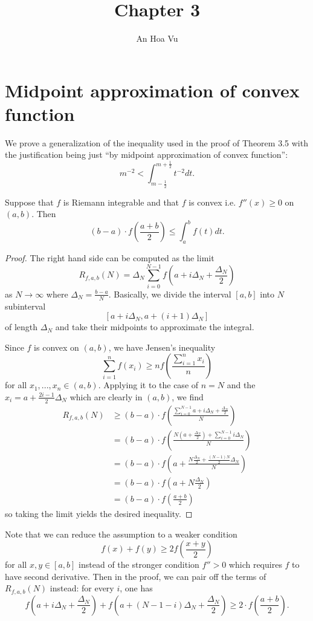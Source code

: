 \documentclass{article}
\title{Chapter 3}
\author{An Hoa Vu}
\begin{document}
\maketitle
\fi

\section{Midpoint approximation of convex function}

We prove a generalization of the inequality used in the proof of Theorem 3.5 with the justification being just ``by midpoint approximation of convex function'':
$$m^{-2} < \int_{m - \frac 12}^{m + \frac 12} t^{-2} dt.$$

Suppose that $f$ is Riemann integrable and that $f$ is convex i.e. $f''(x) \geq 0$ on $(a, b)$. Then
$$(b - a) \cdot f\left(\frac{a+b}{2}\right) \leq \int_a^b f(t) dt.$$

\begin{proof}
The right hand side can be computed as the limit
$$R_{f,a,b}(N) = \Delta_N \sum_{i=0}^{N-1} f\left(a + i \Delta_N + \frac{\Delta_N}{2} \right) $$
as $N \rightarrow \infty$ where $\Delta_N = \frac{b - a}{N}$. Basically, we divide the interval $[a, b]$ into $N$ subinterval
$$[a + i \Delta_N, a + (i+1) \Delta_N]$$
of length $\Delta_N$ and take their midpoints to approximate the integral.

Since $f$ is convex on $(a, b)$, we have Jensen's inequality
$$\sum_{i = 1}^{n} f(x_i) \geq n f\left(\frac{\sum_{i=1}^{n} x_i}{n}\right)$$
for all $x_1, ..., x_n \in (a, b)$. Applying it to the case of $n = N$ and the $x_i = a + \frac{2i - 1}{2} \Delta_N$ which are clearly in $(a, b)$, we find
\begin{align*}
R_{f,a,b}(N) &\geq (b - a) \cdot f \left( \frac{\sum_{i=0}^{N-1} a + i \Delta_N + \frac{\Delta_N}{2} }{N} \right)\\
&= (b - a) \cdot f \left( \frac{N (a + \frac{\Delta_N}{2}) + \sum_{i=0}^{N-1} i \Delta_N }{N} \right)\\
&= (b - a) \cdot f \left( a + \frac{N \frac{\Delta_N}{2} + \frac{(N-1)N}{2} \Delta_N }{N} \right)\\
&= (b - a) \cdot f \left( a + N \frac{\Delta_N }{2} \right)\\
&= (b - a) \cdot f \left( \frac{a + b}{2} \right)
\end{align*}
so taking the limit yields the desired inequality.
\end{proof}

Note that we can reduce the assumption to a weaker condition
$$f(x) + f(y) \geq 2 f\left( \frac{x + y}{2} \right)$$
for all $x, y \in [a, b]$ instead of the stronger condition $f'' > 0$ which requires $f$ to have second derivative. Then in the proof, we can pair off the terms of $R_{f,a,b}(N)$ instead: for every $i$, one has
$$f\left(a + i \Delta_N + \frac{\Delta_N}{2} \right) + f\left(a + (N-1-i) \Delta_N + \frac{\Delta_N}{2} \right) \geq 2 \cdot f \left( \frac{a + b}{2} \right).$$
\end{document}
